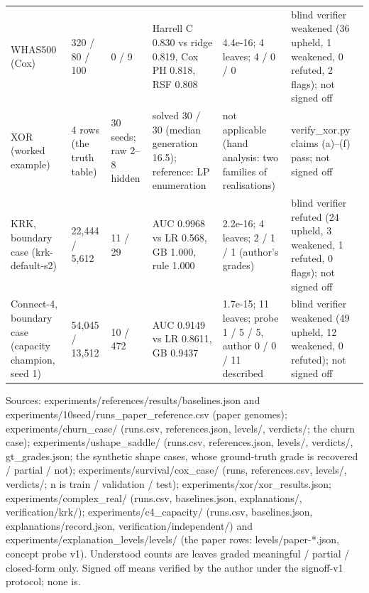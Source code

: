 \begin{table}[htbp]
\begin{tabular}{p{3.2cm}p{1.6cm}p{1.4cm}p{3.6cm}p{3.6cm}p{3.2cm}}
WHAS500 (Cox) & 320 / 80 / 100 & 0 / 9 & Harrell C 0.830 vs ridge 0.819, Cox PH 0.818, RSF 0.808 & 4.4e-16; 4 leaves; 4 / 0 / 0 & blind verifier weakened (36 upheld, 1 weakened, 0 refuted, 2 flags); not signed off \\
XOR (worked example) & 4 rows (the truth table) & 30 seeds; raw 2--8 hidden & solved 30 / 30 (median generation 16.5); reference: LP enumeration & not applicable (hand analysis: two families of realisations) & verify\_xor.py claims (a)--(f) pass; not signed off \\
\midrule
KRK, boundary case (krk-default-s2) & 22,444 / 5,612 & 11 / 29 & AUC 0.9968 vs LR 0.568, GB 1.000, rule 1.000 & 2.2e-16; 4 leaves; 2 / 1 / 1 (author's grades) & blind verifier refuted (24 upheld, 3 weakened, 1 refuted, 0 flags); not signed off \\
Connect-4, boundary case (capacity champion, seed 1) & 54,045 / 13,512 & 10 / 472 & AUC 0.9149 vs LR 0.8611, GB 0.9437 & 1.7e-15; 11 leaves; probe 1 / 5 / 5, author 0 / 0 / 11 described & blind verifier weakened (49 upheld, 12 weakened, 0 refuted); not signed off \\
\bottomrule
\end{tabular}
\begin{flushleft}\footnotesize Sources: experiments/references/results/baselines.json and experiments/10seed/runs\_paper\_reference.csv (paper genomes); experiments/churn\_case/ (runs.csv, references.json, levels/, verdicts/; the churn case); experiments/ushape\_saddle/ (runs.csv, references.json, levels/, verdicts/, gt\_grades.json; the synthetic shape cases, whose ground-truth grade is recovered / partial / not); experiments/survival/cox\_case/ (runs, references.csv, levels/, verdicts/; n is train / validation / test); experiments/xor/xor\_results.json; experiments/complex\_real/ (runs.csv, baselines.json, explanations/, verification/krk/); experiments/c4\_capacity/ (runs.csv, baselines.json, explanations/record.json, verification/independent/) and experiments/explanation\_levels/levels/ (the paper rows: levels/paper-*.json, concept probe v1). Understood counts are leaves graded meaningful / partial / closed-form only. Signed off means verified by the author under the signoff-v1 protocol; none is.\end{flushleft}
\end{table}
